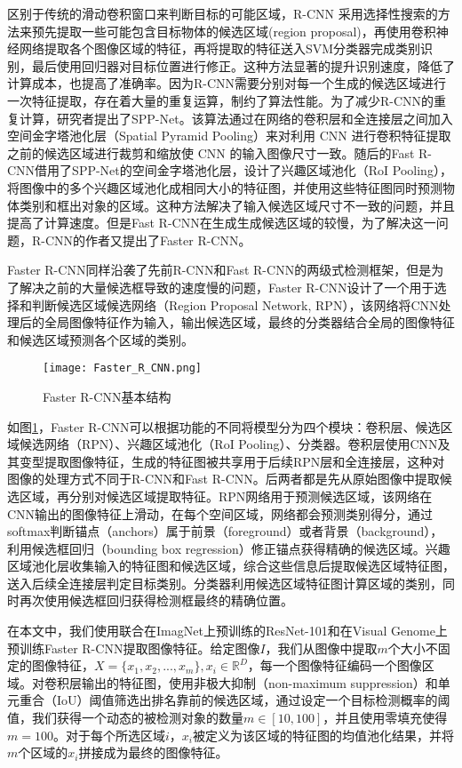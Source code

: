 区别于传统的滑动卷积窗口来判断目标的可能区域，R-CNN 采用选择性搜索的方法来预先提取一些可能包含目标物体的候选区域(region proposal)，再使用卷积神经网络提取各个图像区域的特征，再将提取的特征送入SVM分类器完成类别识别，最后使用回归器对目标位置进行修正。这种方法显著的提升识别速度，降低了计算成本，也提高了准确率。因为R-CNN需要分别对每一个生成的候选区域进行一次特征提取，存在着大量的重复运算，制约了算法性能。为了减少R-CNN的重复计算，研究者提出了SPP-Net。该算法通过在网络的卷积层和全连接层之间加入空间金字塔池化层（Spatial Pyramid Pooling）来对利用 CNN 进行卷积特征提取之前的候选区域进行裁剪和缩放使 CNN 的输入图像尺寸一致。随后的Fast R-CNN借用了SPP-Net的空间金字塔池化层，设计了兴趣区域池化（RoI Pooling），将图像中的多个兴趣区域池化成相同大小的特征图，并使用这些特征图同时预测物体类别和框出对象的区域。这种方法解决了输入候选区域尺寸不一致的问题，并且提高了计算速度。但是Fast R-CNN在生成生成候选区域的较慢，为了解决这一问题，R-CNN的作者又提出了Faster R-CNN。

Faster R-CNN同样沿袭了先前R-CNN和Fast R-CNN的两级式检测框架，但是为了解决之前的大量候选框导致的速度慢的问题，Faster R-CNN设计了一个用于选择和判断候选区域候选网络（Region Proposal Network, RPN），该网络将CNN处理后的全局图像特征作为输入，输出候选区域，最终的分类器结合全局的图像特征和候选区域预测各个区域的类别。
\begin{figure}[H]
	\texttt{[image: Faster\_R\_CNN.png]}
	\caption{Faster R-CNN基本结构}
	\label{Faster_R_CNN}
\end{figure}

如图\ref{Faster_R_CNN}，Faster R-CNN可以根据功能的不同将模型分为四个模块：卷积层、候选区域候选网络（RPN）、兴趣区域池化（RoI Pooling）、分类器。卷积层使用CNN及其变型提取图像特征，生成的特征图被共享用于后续RPN层和全连接层，这种对图像的处理方式不同于R-CNN和Fast R-CNN。后两者都是先从原始图像中提取候选区域，再分别对候选区域提取特征。RPN网络用于预测候选区域，该网络在CNN输出的图像特征上滑动，在每个空间区域，网络都会预测类别得分，通过softmax判断锚点（anchors）属于前景（foreground）或者背景（background），利用候选框回归（bounding box regression）修正锚点获得精确的候选区域。兴趣区域池化层收集输入的特征图和候选区域，综合这些信息后提取候选区域特征图，送入后续全连接层判定目标类别。分类器利用候选区域特征图计算区域的类别，同时再次使用候选框回归获得检测框最终的精确位置。

在本文中，我们使用联合在ImagNet上预训练的ResNet-101和在Visual Genome上预训练Faster R-CNN提取图像特征。给定图像$I$，我们从图像中提取$m$个大小不固定的图像特征，$X=\{x_1, x_2, ..., x_m\}, x_i \in \mathbb{R}^D$，每一个图像特征编码一个图像区域。对卷积层输出的特征图，使用非极大抑制（non-maximum suppression）和单元重合（IoU）阈值筛选出排名靠前的候选区域，通过设定一个目标检测概率的阈值，我们获得一个动态的被检测对象的数量$m \in [10,100]$，并且使用零填充使得$m=100$。对于每个所选区域$i$，$x_i$被定义为该区域的特征图的均值池化结果，并将$m$个区域的$x_i$拼接成为最终的图像特征。

